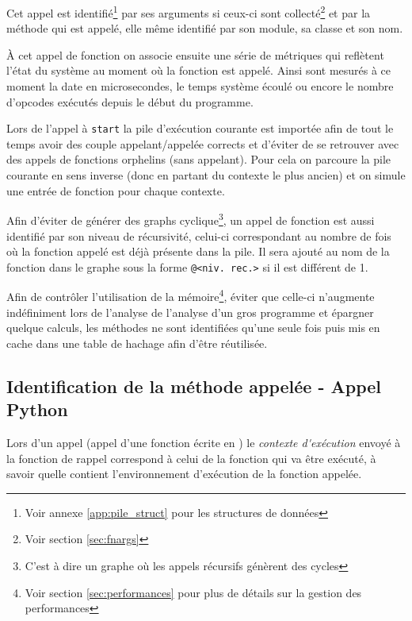Cet appel est identifié\footnote{Voir annexe \vref{app:pile_struct} pour les structures de données} par ses arguments si ceux-ci sont collecté\footnote{Voir section \vref{sec:fnargs}} et par la méthode qui est appelé, elle même identifié par son module, sa classe et son nom. 

À cet appel de fonction on associe ensuite une série de métriques qui reflètent l'état du système au moment où la fonction est appelé. Ainsi sont mesurés à ce moment la date en microsecondes, le temps système écoulé ou encore le nombre d'opcodes exécutés depuis le début du programme.

\begin{note}
Lors de l'appel à \verb|start| la pile d'exécution courante est importée afin de tout le temps avoir des couple appelant/appelée corrects et d'éviter de se retrouver avec des appels de fonctions orphelins (sans appelant). Pour cela on parcoure la pile courante en sens inverse (donc en partant du contexte le plus ancien) et on simule une entrée de fonction pour chaque contexte.
\end{note}

\begin{note}
Afin d'éviter de générer des graphs cyclique\footnote{C'est à dire un graphe où les appels récursifs génèrent des cycles}, un appel de fonction est aussi identifié par son niveau de récursivité, celui-ci correspondant au nombre de fois où la fonction appelé est déjà présente dans la pile. Il sera ajouté au nom de la fonction dans le graphe sous la forme \verb|@<niv. rec.>| si il est différent de 1.
\end{note}

\begin{note}[Performances]
Afin de contrôler l'utilisation de la mémoire\footnote{Voir section \vref{sec:performances} pour plus de détails sur la gestion des performances}, éviter que celle-ci n'augmente indéfiniment lors de l'analyse de l'analyse d'un gros programme et épargner quelque calculs, les méthodes ne sont identifiées qu'une seule fois puis mis en cache dans une table de hachage afin d'être réutilisée.
\end{note}

\subsection{Identification de la méthode appelée - Appel Python}
\label{ident-python}
Lors d'un appel \Python (appel d'une fonction écrite en \Python) le \emph{\gls{contexte d'exécution}} envoyé à la fonction de rappel correspond à celui de la fonction qui va être exécuté, à savoir quelle contient l’environnement d'exécution de la fonction appelée.

